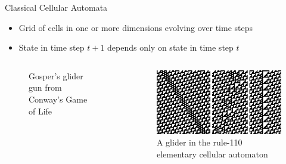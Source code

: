 \documentclass[aspectratio=169]{beamer}
\begin{document}
\begin{frame}[t]{Classical Cellular Automata}
    \begin{itemize}
        \item Grid of cells in one or more dimensions evolving over time steps
        \item State in time step $t+1$ depends only on state in time step $t$
    \end{itemize}
    \begin{columns}
    \begin{figure}
        \centering
        \caption{Gosper's glider gun from Conway's Game of Life}
        \label{fig:conway}
    \end{figure}
    \begin{figure}
        \centering
        \includegraphics[width=\columnwidth]{graphics/R110.png}
        \caption{A glider in the rule-110 elementary cellular automaton}
        \label{fig:my_label}
    \end{figure}
    \end{columns}
    \vspace{1000pt}
\end{frame}
\end{document}
